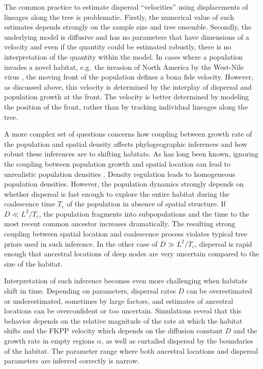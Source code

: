 \documentclass[aps,rmp, twocolumn]{revtex4}
\begin{document}
The common practice to estimate dispersal ``velocities'' using displacements of lineages along the tree \citep{dellicour_relax_2021} is problematic.
Firstly, the numerical value of such estimates depends strongly on the sample size and tree ensemble.
Secondly, the underlying model is diffusive and has no parameters that have dimensions of a velocity and even if the quantity could be estimated robustly, there is no interpretation of the quantity within the model.
In cases where a population invades a novel habitat, e.g.~the invasion of North America by the West-Nile virus \citep{pybus_unifying_2012}, the moving front of the population defines a bona fide velocity.
However, as discussed above, this velocity is determined by the interplay of dispersal and population growth at the front.
The velocity is better determined by modeling the position of the front, rather than by tracking individual lineages along the tree.


A more complex set of questions concerns how coupling between growth rate of the population and spatial density affects phylogeographic inferences and how robust these inferences are to shifting habitats.
As has long been known, ignoring the coupling between population growth and spatial location can lead to unrealistic population densities \citep{felsenstein_pain_1975}.
Density regulation leads to homogeneous population densities.
However, the population dynamics strongly depends on whether dispersal is fast enough to explore the entire habitat during the coalescence time $T_c$ of the population in absence of spatial structure.
If $D\ll L^2/T_c$, the population fragments into subpopulations and the time to the most recent common ancestor increases dramatically.
The resulting strong coupling between spatial location and coalescence process violates typical tree priors used in such inference.
In the other case of $D\gg L^2/T_c$, dispersal is rapid enough that ancestral locations of deep nodes are very uncertain compared to the size of the habitat.

Interpretation of such inference becomes even more challenging when habitats shift in time.
Depending on parameters, dispersal rates $D$ can be overestimated or underestimated, sometimes by large factors, and estimates of ancestral locations can be overconfident or too uncertain.
Simulations reveal that this behavior depends on the relative magnitude of the rate at which the habitat shifts and the FKPP velocity which depends on the diffusion constant $D$ and the growth rate in empty regions $\alpha$, as well as curtailed dispersal by the boundaries of the habitat.
The parameter range where both ancestral locations and dispersal parameters are inferred correctly is narrow.
\end{document}
